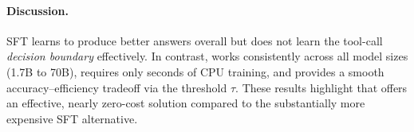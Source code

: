 \paragraph{Discussion.}
SFT learns to produce better answers overall but does not learn the tool-call \emph{decision boundary} effectively. In contrast, \method{} works consistently across all model sizes (1.7B to 70B), requires only seconds of CPU training, and provides a smooth accuracy--efficiency tradeoff via the threshold $\tau$. These results highlight that \method{} offers an effective, nearly zero-cost solution compared to the substantially more expensive SFT alternative.

